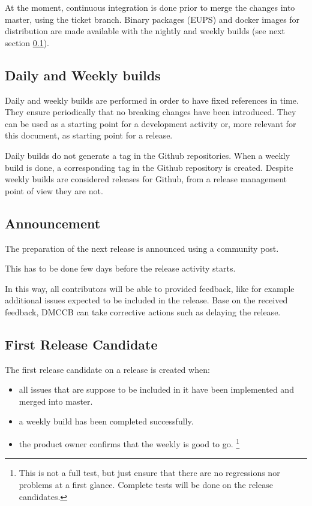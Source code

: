 At the moment, continuous integration is done prior to merge the changes into master, using the ticket branch. Binary packages (EUPS) and docker images for distribution are made available with the nightly and weekly builds (see next section \ref{sec:weekly}).


\subsection{Daily and Weekly builds} \label{sec:weekly}

Daily and weekly builds are performed in order to have fixed references in time.
They ensure periodically that no breaking changes have been introduced.
They can be used as a starting point for a development activity or, more relevant for this document, as starting point for a release.

Daily builds do not generate a tag in the Github repositories.
When a weekly build is done, a corresponding tag in the Github repository is created.
Despite weekly builds are considered releases for Github, from a release management point of view they are not.


\subsection{Announcement} \label{sec:anaouncement}

The preparation of the next release is announced using a community post.

This has to be done few days before the release activity starts.

In this way, all contributors will be able to provided feedback, like for example additional issues expected to be included in the release.
Base on the received feedback, DMCCB can take corrective actions such as delaying the release.


\subsection{First Release Candidate} \label{sec:firstrc}

The first release candidate on a release is created when:

\begin{itemize}
\item all issues that are suppose to be included in it have been implemented and merged into master.
\item a weekly build has been completed successfully.
\item the product owner confirms that the weekly is good to go. \footnote{This is not a full test, but just ensure that there are no regressions nor problems at a first glance. Complete tests will be done on the release candidates.}
\end{itemize}


